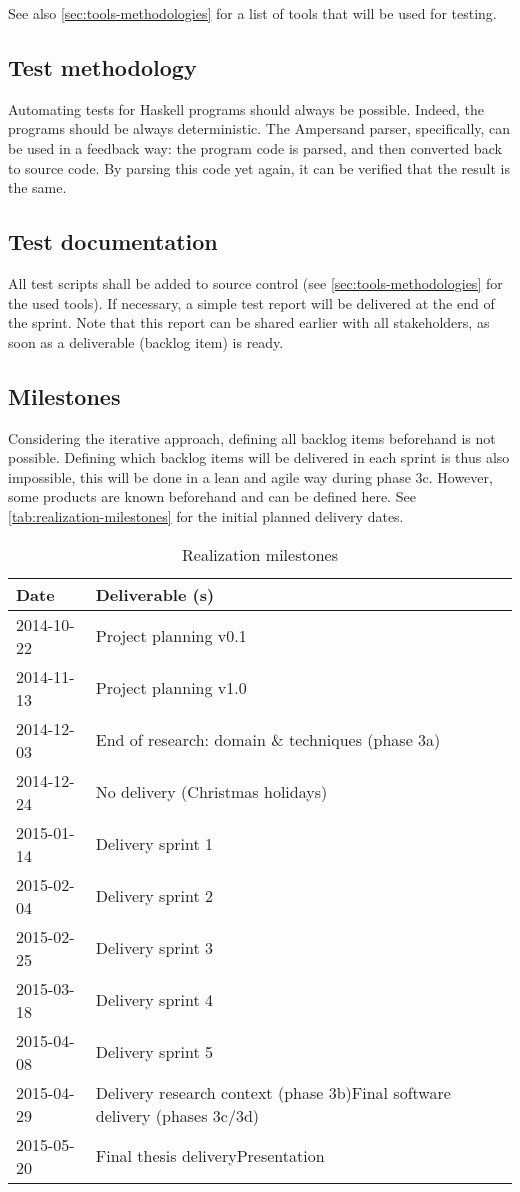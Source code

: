 See also \autoref{sec:tools-methodologies} for a list of tools that will be used for testing.

\subsection{Test methodology}
Automating tests for Haskell programs should always be possible.
Indeed, the programs should be always deterministic.
The Ampersand parser, specifically, can be used in a feedback way: the program code is parsed, and then converted back to source code.
By parsing this code yet again, it can be verified that the result is the same.

\subsection{Test documentation}
\label{subsec:test-documentation}
All test scripts shall be added to source control (see \autoref{sec:tools-methodologies} for the used tools).
If necessary, a simple test report will be delivered at the end of the sprint.
Note that this report can be shared earlier with all stakeholders, as soon as a deliverable (backlog item) is ready.

\subsection{Milestones}
Considering the iterative approach, defining all backlog items beforehand is not possible.
Defining which backlog items will be delivered in each sprint is thus also impossible, this will be done in a lean and agile way during phase 3c.
However, some products are known beforehand and can be defined here.
See \autoref{tab:realization-milestones} for the initial planned delivery dates.
%
\begin{table}[h]
  \begin{tabular}{|l|l|}\hline
    \textbf{Date} & \textbf{Deliverable (s)} \\\hline
    2014-10-22 & Project planning v0.1 \\\hline
    2014-11-13 & Project planning v1.0 \\\hline
    2014-12-03 & End of research: domain \& techniques (phase 3a) \\\hline
    2014-12-24 & No delivery (Christmas holidays) \\\hline
    2015-01-14 & Delivery sprint 1\\\hline
    2015-02-04 & Delivery sprint 2\\\hline
    2015-02-25 & Delivery sprint 3\\\hline
    2015-03-18 & Delivery sprint 4\\\hline
    2015-04-08 & Delivery sprint 5\\\hline
    2015-04-29 & Delivery research context (phase 3b)\newline{}Final software delivery (phases 3c/3d)\\\hline
    2015-05-20 & Final thesis delivery\newline{}Presentation\\\hline
  \end{tabular}
  \caption{Realization milestones}
  \label{tab:realization-milestones}
\end{table}